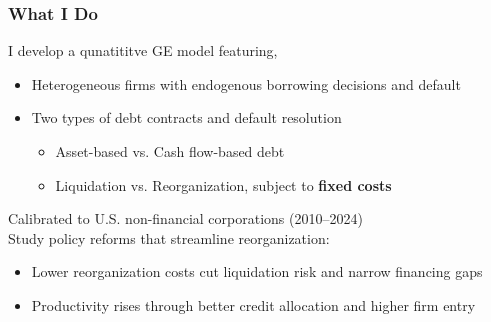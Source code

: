 \documentclass[aspectratio=169,xcolor=table]{beamer}
\begin{document}
\begin{frame}[label=whatido] \frametitle{What I Do}

I develop a qunatititve GE model featuring,
\begin{itemize} 
    \item Heterogeneous firms with endogenous borrowing decisions and default
    \item Two types of debt contracts and default resolution  \vspace{1mm}
\begin{itemize} \small
    \item Asset-based vs. Cash flow-based debt 
    \item Liquidation vs. Reorganization, subject to \textcolor{primary}{\textbf{fixed costs}}  \end{itemize}
\end{itemize} \normalsize  \vspace{5mm}

Calibrated to U.S. non-financial corporations (2010--2024) \vspace{5mm} \\

Study policy reforms that streamline reorganization:
\begin{itemize} \small
    \item Lower reorganization costs cut liquidation risk and narrow financing gaps
    \item Productivity rises through better credit allocation and higher firm entry
\end{itemize} \normalsize 
\end{frame}
\end{document}

